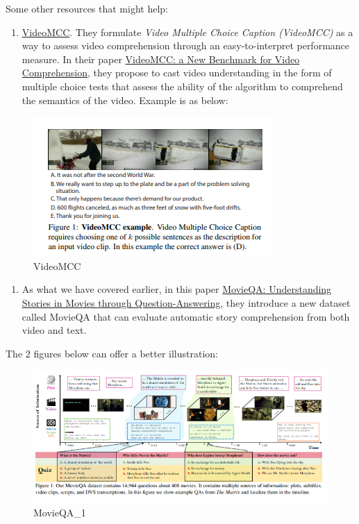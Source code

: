 \documentclass[]{book}
\providecommand{\tightlist}{%
  \setlength{\itemsep}{0pt}\setlength{\parskip}{0pt}}
\theoremstyle{definition}
\theoremstyle{definition}
\theoremstyle{definition}
\theoremstyle{remark}
\begin{document}
Some other resources that might help:

\begin{enumerate}
\def\labelenumi{\arabic{enumi}.}
\setcounter{enumi}{2}
\tightlist
\item
  \href{http://videomcc.org/}{VideoMCC}. They formulate \emph{Video
  Multiple Choice Caption (VideoMCC)} as a way to assess video
  comprehension through an easy-to-interpret performance measure. In
  their paper \href{https://arxiv.org/pdf/1606.07373.pdf}{VideoMCC: a
  New Benchmark for Video Comprehension}, they propose to cast video
  understanding in the form of multiple choice tests that assess the
  ability of the algorithm to comprehend the semantics of the video.
  Example is as below:
\end{enumerate}

\begin{figure}
\centering
\includegraphics{img/mcc.png}
\caption{VideoMCC}
\end{figure}

\begin{enumerate}
\def\labelenumi{\arabic{enumi}.}
\setcounter{enumi}{3}
\tightlist
\item
  As what we have covered earlier, in this paper
  \href{https://arxiv.org/pdf/1512.02902.pdf}{MovieQA: Understanding
  Stories in Movies through Question-Answering}, they introduce a new
  dataset called MovieQA that can evaluate automatic story comprehension
  from both video and text.
\end{enumerate}

The 2 figures below can offer a better illustration:

\begin{figure}
\centering
\includegraphics{img/movieqa1.png}
\caption{MovieQA\_1}
\end{figure}
\end{document}
